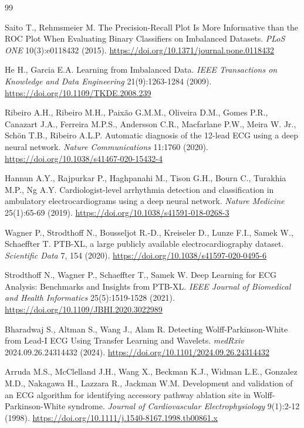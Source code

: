 \documentclass[11pt]{article}
\begin{document}
\begin{thebibliography}{99}

Saito T., Rehmsmeier M. The Precision-Recall Plot Is More Informative than the ROC Plot When Evaluating Binary Classifiers on Imbalanced Datasets. \textit{PLoS ONE} 10(3):e0118432 (2015). \url{https://doi.org/10.1371/journal.pone.0118432}

He H., Garcia E.A. Learning from Imbalanced Data. \textit{IEEE Transactions on Knowledge and Data Engineering} 21(9):1263-1284 (2009). \url{https://doi.org/10.1109/TKDE.2008.239}

Ribeiro A.H., Ribeiro M.H., Paix\~ao G.M.M., Oliveira D.M., Gomes P.R., Canazart J.A., Ferreira M.P.S., Andersson C.R., Macfarlane P.W., Meira W. Jr., Sch\"on T.B., Ribeiro A.L.P. Automatic diagnosis of the 12-lead ECG using a deep neural network. \textit{Nature Communications} 11:1760 (2020). \url{https://doi.org/10.1038/s41467-020-15432-4}

Hannun A.Y., Rajpurkar P., Haghpanahi M., Tison G.H., Bourn C., Turakhia M.P., Ng A.Y. Cardiologist-level arrhythmia detection and classification in ambulatory electrocardiograms using a deep neural network. \textit{Nature Medicine} 25(1):65-69 (2019). \url{https://doi.org/10.1038/s41591-018-0268-3}

Wagner P., Strodthoff N., Bousseljot R.-D., Kreiseler D., Lunze F.I., Samek W., Schaeffter T. PTB-XL, a large publicly available electrocardiography dataset. \textit{Scientific Data} 7, 154 (2020). \url{https://doi.org/10.1038/s41597-020-0495-6}

Strodthoff N., Wagner P., Schaeffter T., Samek W. Deep Learning for ECG Analysis: Benchmarks and Insights from PTB-XL. \textit{IEEE Journal of Biomedical and Health Informatics} 25(5):1519-1528 (2021). \url{https://doi.org/10.1109/JBHI.2020.3022989}

Bharadwaj S., Altman S., Wang J., Alam R. Detecting Wolff-Parkinson-White from Lead-I ECG Using Transfer Learning and Wavelets. \textit{medRxiv} 2024.09.26.24314432 (2024). \url{https://doi.org/10.1101/2024.09.26.24314432}

Arruda M.S., McClelland J.H., Wang X., Beckman K.J., Widman L.E., Gonzalez M.D., Nakagawa H., Lazzara R., Jackman W.M. Development and validation of an ECG algorithm for identifying accessory pathway ablation site in Wolff-Parkinson-White syndrome. \textit{Journal of Cardiovascular Electrophysiology} 9(1):2-12 (1998). \url{https://doi.org/10.1111/j.1540-8167.1998.tb00861.x}


\end{thebibliography}
\end{document}

